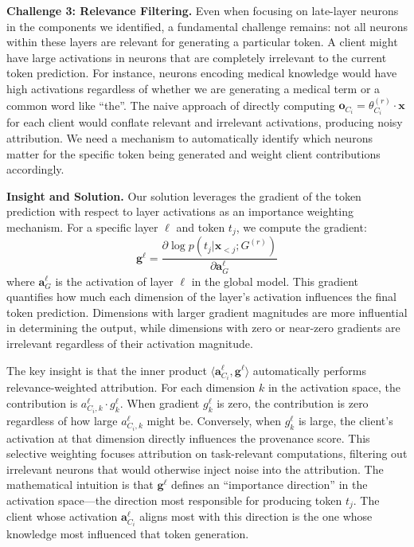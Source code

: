 \textbf{Challenge 3: Relevance Filtering.} Even when focusing on late-layer neurons in the components we identified, a fundamental challenge remains: not all neurons within these layers are relevant for generating a particular token. A client might have large activations in neurons that are completely irrelevant to the current token prediction. For instance, neurons encoding medical knowledge would have high activations regardless of whether we are generating a medical term or a common word like ``the''. The naive approach of directly computing $\mathbf{o}_{C_i} = \theta_{C_i}^{(r)} \cdot \mathbf{x}$ for each client would conflate relevant and irrelevant activations, producing noisy attribution. We need a mechanism to automatically identify which neurons matter for the specific token being generated and weight client contributions accordingly.

\textbf{Insight and Solution.} Our solution leverages the gradient of the token prediction with respect to layer activations as an importance weighting mechanism. For a specific layer $\ell$ and token $t_j$, we compute the gradient:
\begin{equation}
\label{eq:gradient}
\mathbf{g}^\ell = \frac{\partial \log p(t_j | \mathbf{x}_{<j}; G^{(r)})}{\partial \mathbf{a}_G^\ell}
\end{equation}
where $\mathbf{a}_G^\ell$ is the activation of layer $\ell$ in the global model. This gradient quantifies how much each dimension of the layer's activation influences the final token prediction. Dimensions with larger gradient magnitudes are more influential in determining the output, while dimensions with zero or near-zero gradients are irrelevant regardless of their activation magnitude.

The key insight is that the inner product $\langle \mathbf{a}_{C_i}^\ell, \mathbf{g}^\ell \rangle$ automatically performs relevance-weighted attribution. For each dimension $k$ in the activation space, the contribution is $a_{C_i,k}^\ell \cdot g_k^\ell$. When gradient $g_k^\ell$ is zero, the contribution is zero regardless of how large $a_{C_i,k}^\ell$ might be. Conversely, when $g_k^\ell$ is large, the client's activation at that dimension directly influences the provenance score. This selective weighting focuses attribution on task-relevant computations, filtering out irrelevant neurons that would otherwise inject noise into the attribution. The mathematical intuition is that $\mathbf{g}^\ell$ defines an ``importance direction'' in the activation space---the direction most responsible for producing token $t_j$. The client whose activation $\mathbf{a}_{C_i}^\ell$ aligns most with this direction is the one whose knowledge most influenced that token generation.

